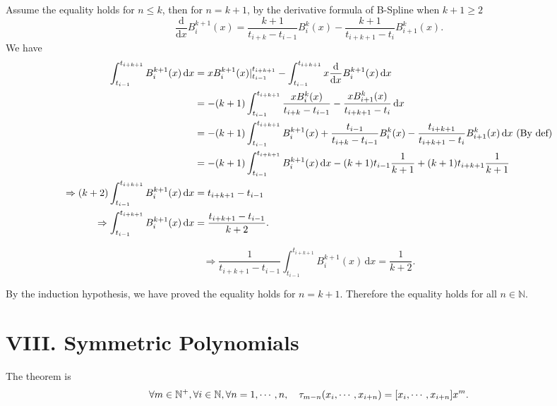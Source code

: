 \documentclass[a4paper]{article}
\begin{document}
Assume the equality holds for $n \leq k$, then for $n=k+1$, by the derivative formula of B-Spline when $k+1 \geq 2$
\begin{equation}
    \frac{\mathrm{d} }{\mathrm{d} x} B_i^{k+1}(x) = \frac{k+1}{t_{i+k} - t_{i-1}} B_i^{k}(x) - \frac{k+1}{t_{i+k+1} - t_{i}} B_{i+1}^{k}(x).  
\end{equation}
We have
\begin{equation}
    \begin{aligned}
        \int_{t_{i-1}}^{t_{i+k+1}} B_i^{k+1}(x) \,\mathrm{d}x &= x B_i^{k+1}(x) \vert_{t_{i-1}}^{t_{i+k+1}} - \int_{t_{i-1}}^{t_{i+k+1}} x \frac{\mathrm{d} }{\mathrm{d} x} B_i^{k+1}(x) \,\mathrm{d}x \\ 
        &= -\qty(k+1) \int_{t_{i-1}}^{t_{i+k+1}} \frac{x B_i^k(x)}{t_{i+k}-t_{i-1}} - \frac{x B_{i+1}^k(x)}{t_{i+k+1}-t_{i}} \,\mathrm{d}x \\ 
        &= -\qty(k+1) \int_{t_{i-1}}^{t_{i+k+1}} B_{i}^{k+1}(x) + \frac{t_{i-1}}{t_{i+k}-t_{i-1}} B_i^k(x) - \frac{t_{i+k+1}}{t_{i+k+1}-t_{i}} B_{i+1}^k(x) \,\mathrm{d}x ~(\text{By def})\\
        &= -\qty(k+1) \int_{t_{i-1}}^{t_{i+k+1}} B_{i}^{k+1}(x) \, \mathrm{d}x - \qty(k+1) t_{i-1} \frac{1}{k+1} + \qty(k+1) t_{i+k+1} \frac{1}{k+1} \\
        \Rightarrow \qty(k+2) \int_{t_{i-1}}^{t_{i+k+1}} B_{i}^{k+1}(x) \, \mathrm{d}x &= t_{i+k+1} - t_{i-1} \\
        \Rightarrow \int_{t_{i-1}}^{t_{i+k+1}} B_{i}^{k+1}(x) \, \mathrm{d}x &= \frac{t_{i+k+1} - t_{i-1}}{k+2}.
    \end{aligned}
\end{equation}

\begin{equation}
    \Rightarrow \frac{1}{t_{i+k+1} - t_{i-1}} \int_{t_{i-1}}^{t_{i+k+1}} B_{i}^{k+1}(x) \, \mathrm{d}x = \frac{1}{k+2}.
\end{equation}

By the induction hypothesis, we have proved the equality holds for $n=k+1$. Therefore the equality holds for all $n \in \mathbb{N}$.


\section*{VIII. Symmetric Polynomials}

The theorem is 
\begin{equation}
    \forall m \in \mathbb{N}^+, \forall i \in \mathbb{N}, \forall n=1,\cdots,n, \quad \tau_{m-n} \qty(x_i,\cdots,x_{i+n}) = [x_i,\cdots,x_{i+n}]x^m.
\end{equation}
\end{document}
